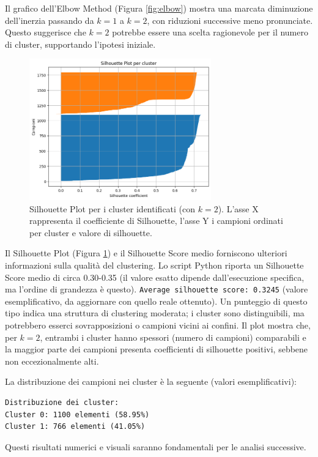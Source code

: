 \documentclass[11pt, a4paper]{article}
\begin{document}
Il grafico dell'Elbow Method (Figura \ref{fig:elbow}) mostra una marcata diminuzione dell'inerzia passando da $k=1$ a $k=2$, con riduzioni successive meno pronunciate. Questo suggerisce che $k=2$ potrebbe essere una scelta ragionevole per il numero di cluster, supportando l'ipotesi iniziale.

\begin{figure}[H]
    \centering
    \includegraphics[width=0.7\textwidth]{images/silhouette_plot.png}
    \caption{Silhouette Plot per i cluster identificati (con $k=2$). L'asse X rappresenta il coefficiente di Silhouette, l'asse Y i campioni ordinati per cluster e valore di silhouette.}
    \label{fig:silhouette}
\end{figure}

Il Silhouette Plot (Figura \ref{fig:silhouette}) e il Silhouette Score medio forniscono ulteriori informazioni sulla qualità del clustering. Lo script Python riporta un Silhouette Score medio di circa 0.30-0.35 (il valore esatto dipende dall'esecuzione specifica, ma l'ordine di grandezza è questo).
\texttt{Average silhouette score: 0.3245} (valore esemplificativo, da aggiornare con quello reale ottenuto).
Un punteggio di questo tipo indica una struttura di clustering moderata; i cluster sono distinguibili, ma potrebbero esserci sovrapposizioni o campioni vicini ai confini. Il plot mostra che, per $k=2$, entrambi i cluster hanno spessori (numero di campioni) comparabili e la maggior parte dei campioni presenta coefficienti di silhouette positivi, sebbene non eccezionalmente alti.

La distribuzione dei campioni nei cluster è la seguente (valori esemplificativi):
\begin{verbatim}
Distribuzione dei cluster:
Cluster 0: 1100 elementi (58.95%)
Cluster 1: 766 elementi (41.05%)
\end{verbatim}
Questi risultati numerici e visuali saranno fondamentali per le analisi successive.
\end{document}
